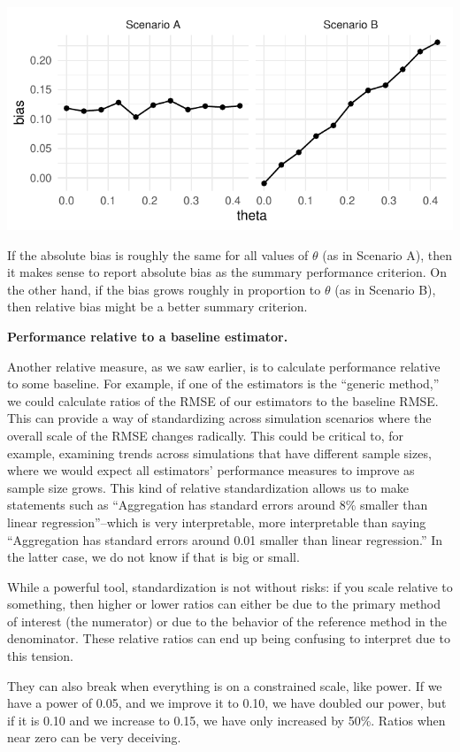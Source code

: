 \documentclass[
]{book}
\begin{document}
\begin{center}\includegraphics[width=0.75\linewidth]{Designing-Simulations-in-R_files/figure-latex/unnamed-chunk-105-1} \end{center}

If the absolute bias is roughly the same for all values of \(\theta\) (as in Scenario A), then it makes sense to report absolute bias as the summary performance criterion.
On the other hand, if the bias grows roughly in proportion to \(\theta\) (as in Scenario B), then relative bias might be a better summary criterion.

\textbf{Performance relative to a baseline estimator.}

Another relative measure, as we saw earlier, is to calculate performance relative to some baseline.
For example, if one of the estimators is the ``generic method,'' we could calculate ratios of the RMSE of our estimators to the baseline RMSE.
This can provide a way of standardizing across simulation scenarios where the overall scale of the RMSE changes radically.
This could be critical to, for example, examining trends across simulations that have different sample sizes, where we would expect all estimators' performance measures to improve as sample size grows.
This kind of relative standardization allows us to make statements such as ``Aggregation has standard errors around 8\% smaller than linear regression''--which is very interpretable, more interpretable than saying ``Aggregation has standard errors around 0.01 smaller than linear regression.''
In the latter case, we do not know if that is big or small.

While a powerful tool, standardization is not without risks: if you scale relative to something, then higher or lower ratios can either be due to the primary method of interest (the numerator) or due to the behavior of the reference method in the denominator.
These relative ratios can end up being confusing to interpret due to this tension.

They can also break when everything is on a constrained scale, like power.
If we have a power of 0.05, and we improve it to 0.10, we have doubled our power, but if it is 0.10 and we increase to 0.15, we have only increased by 50\%.
Ratios when near zero can be very deceiving.
\end{document}
